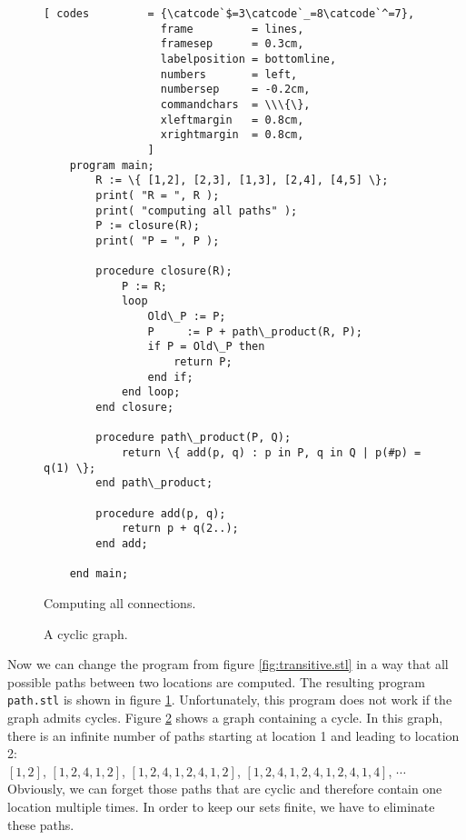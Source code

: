 \begin{figure}[!ht]
  \centering
\begin{Verbatim}[ codes         = {\catcode`$=3\catcode`_=8\catcode`^=7},
                  frame         = lines, 
                  framesep      = 0.3cm, 
                  labelposition = bottomline,
                  numbers       = left,
                  numbersep     = -0.2cm,
                  commandchars  = \\\{\},
                  xleftmargin   = 0.8cm,
                  xrightmargin  = 0.8cm,
                ]
    program main;
        R := \{ [1,2], [2,3], [1,3], [2,4], [4,5] \};
        print( "R = ", R );
        print( "computing all paths" );
        P := closure(R);
        print( "P = ", P );
        
        procedure closure(R);
            P := R;
            loop
                Old\_P := P;
                P     := P + path\_product(R, P);
                if P = Old\_P then
                    return P;
                end if;
            end loop;
        end closure;
    
        procedure path\_product(P, Q);
            return \{ add(p, q) : p in P, q in Q | p(#p) = q(1) \};
        end path\_product;    
    
        procedure add(p, q);
            return p + q(2..);
        end add;
    
    end main;
\end{Verbatim} 
\vspace*{-0.3cm}
\caption{Computing all connections.}  \label{fig:path.stl}
\end{figure} %

\begin{figure}[!ht]
  \centering
  \caption{A cyclic graph.}
  \label{fig:graph-zykl}
\end{figure}

Now we can change the program from figure 
\ref{fig:transitive.stl} in a way that all possible paths between two locations are computed.
The resulting program \texttt{path.stl} is shown in figure \ref{fig:path.stl}.
Unfortunately,  this program does not work if the graph admits cycles.
Figure \ref{fig:graph-zykl} shows a graph containing a cycle.  In this graph,
there is an infinite number of paths starting at location  1 and leading to location 2: \\[0.2cm]
\hspace*{1.3cm} 
$[ 1, 2 ]$, $[ 1, 2, 4, 1, 2 ]$, 
$[ 1, 2, 4, 1, 2, 4, 1, 2 ]$, 
$[ 1, 2, 4, 1, 2, 4, 1, 2, 4, 1, 4 ]$, $\cdots$
\\[0.2cm]
Obviously, we can forget those paths that are cyclic and therefore contain one location multiple times.
In order to keep our sets finite, we have to eliminate these paths.


